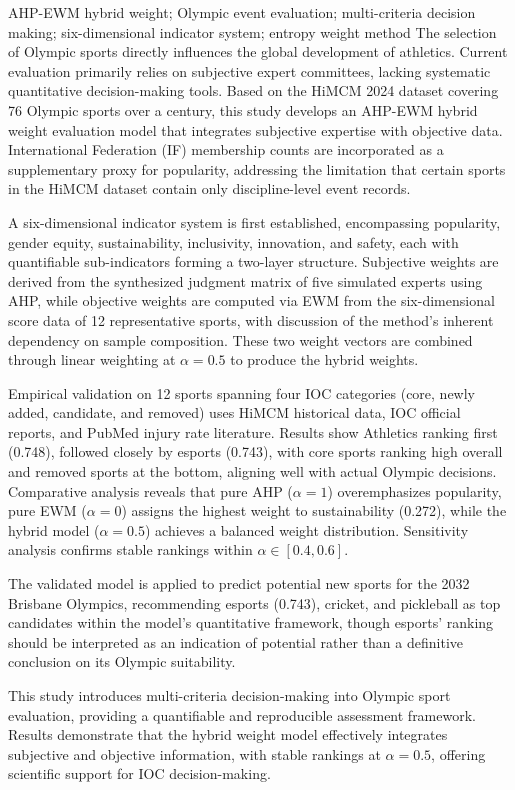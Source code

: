 \documentclass[twoside]{CUGThesis}
\begin{document}
\begin{enabstract}{AHP-EWM hybrid weight; Olympic event evaluation; multi-criteria decision making; six-dimensional indicator system; entropy weight method}
The selection of Olympic sports directly influences the global development of athletics.
Current evaluation primarily relies on subjective expert committees,
lacking systematic quantitative decision-making tools.
Based on the HiMCM 2024 dataset covering 76 Olympic sports over a century,
this study develops an AHP-EWM hybrid weight evaluation model
that integrates subjective expertise with objective data.
International Federation (IF) membership counts are incorporated
as a supplementary proxy for popularity,
addressing the limitation that certain sports in the HiMCM dataset
contain only discipline-level event records.

A six-dimensional indicator system is first established,
encompassing popularity, gender equity, sustainability, inclusivity,
innovation, and safety, each with quantifiable sub-indicators
forming a two-layer structure.
Subjective weights are derived from the synthesized judgment matrix
of five simulated experts using AHP,
while objective weights are computed via EWM
from the six-dimensional score data of 12 representative sports,
with discussion of the method's inherent dependency on sample composition.
These two weight vectors are combined through linear weighting
at $\alpha=0.5$ to produce the hybrid weights.

Empirical validation on 12 sports spanning four IOC categories
(core, newly added, candidate, and removed) uses HiMCM historical data,
IOC official reports, and PubMed injury rate literature.
Results show Athletics ranking first (0.748), followed closely by esports (0.743),
with core sports ranking high overall and removed sports at the bottom,
aligning well with actual Olympic decisions.
Comparative analysis reveals that pure AHP ($\alpha=1$) overemphasizes popularity,
pure EWM ($\alpha=0$) assigns the highest weight to sustainability (0.272),
while the hybrid model ($\alpha=0.5$) achieves a balanced weight distribution.
Sensitivity analysis confirms stable rankings within $\alpha\in[0.4,0.6]$.

The validated model is applied to predict potential new sports
for the 2032 Brisbane Olympics,
recommending esports (0.743), cricket, and pickleball as top candidates
within the model's quantitative framework,
though esports' ranking should be interpreted as an indication of potential
rather than a definitive conclusion on its Olympic suitability.

This study introduces multi-criteria decision-making into Olympic sport evaluation,
providing a quantifiable and reproducible assessment framework.
Results demonstrate that the hybrid weight model effectively integrates
subjective and objective information,
with stable rankings at $\alpha=0.5$,
offering scientific support for IOC decision-making.
\end{enabstract}
\end{document}
